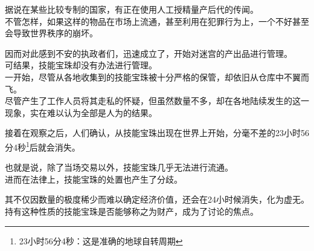 据说在某些比较专制的国家，有正在使用人工授精量产后代的传闻。\\

不管怎样，如果这样的物品在市场上流通，甚至利用在犯罪行为上，一个不好甚至会导致世界秩序的崩坏。

因而对此感到不安的执政者们，迅速成立了，开始对迷宫的产出品进行管理。\\

可结果，技能宝珠却没有办法进行管理。\\

一开始，尽管从各地收集到的技能宝珠被十分严格的保管，却依旧从仓库中不翼而飞。\\

尽管产生了工作人员将其走私的怀疑，但虽然数量不多，却在各地陆续发生的这一现象，实在难以认为全部是人为的结果。

接着在观察之后，人们确认，从技能宝珠出现在世界上开始，分毫不差的23小时56分4秒\footnote{23小时56分4秒：这是准确的地球自转周期}后就会消失。

也就是说，除了当场交易以外，技能宝珠几乎无法进行流通。\\

进而在法律上，技能宝珠的处置也产生了分歧。

其不仅因数量的极度稀少而难以确定经济价值，还会在24小时候消失，化为虚无。持有这种性质的技能宝珠是否能够称之为财产，成为了讨论的焦点。

